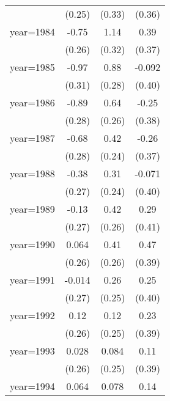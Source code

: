 \begin{sidewaystable}[htbp]
\begin{tabular}{l*{3}{c}}
                &   (0.25)         &   (0.33)         &   (0.36)         \\
\addlinespace
year=1984       &    -0.75\sym{***}&     1.14\sym{***}&     0.39         \\
                &   (0.26)         &   (0.32)         &   (0.37)         \\
\addlinespace
year=1985       &    -0.97\sym{***}&     0.88\sym{***}&   -0.092         \\
                &   (0.31)         &   (0.28)         &   (0.40)         \\
\addlinespace
year=1986       &    -0.89\sym{***}&     0.64\sym{**} &    -0.25         \\
                &   (0.28)         &   (0.26)         &   (0.38)         \\
\addlinespace
year=1987       &    -0.68\sym{**} &     0.42\sym{*}  &    -0.26         \\
                &   (0.28)         &   (0.24)         &   (0.37)         \\
\addlinespace
year=1988       &    -0.38         &     0.31         &   -0.071         \\
                &   (0.27)         &   (0.24)         &   (0.40)         \\
\addlinespace
year=1989       &    -0.13         &     0.42         &     0.29         \\
                &   (0.27)         &   (0.26)         &   (0.41)         \\
\addlinespace
year=1990       &    0.064         &     0.41         &     0.47         \\
                &   (0.26)         &   (0.26)         &   (0.39)         \\
\addlinespace
year=1991       &   -0.014         &     0.26         &     0.25         \\
                &   (0.27)         &   (0.25)         &   (0.40)         \\
\addlinespace
year=1992       &     0.12         &     0.12         &     0.23         \\
                &   (0.26)         &   (0.25)         &   (0.39)         \\
\addlinespace
year=1993       &    0.028         &    0.084         &     0.11         \\
                &   (0.26)         &   (0.25)         &   (0.39)         \\
\addlinespace
year=1994       &    0.064         &    0.078         &     0.14         \\

\end{tabular}
\end{sidewaystable}
